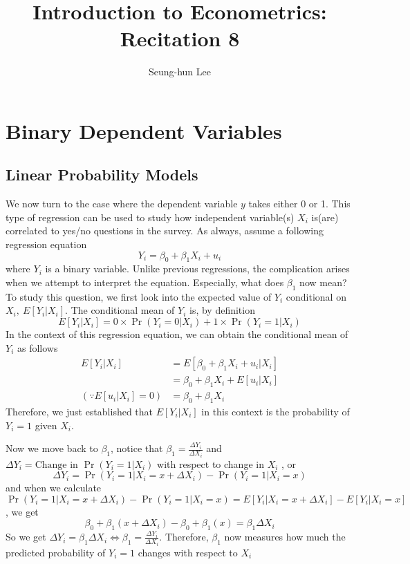 \documentclass[12pt]{article}
\title{Introduction to Econometrics: Recitation 8}
\theoremstyle{definition}
\theoremstyle{property}
\theoremstyle{assumption}
\theoremstyle{example}
\theoremstyle{comment}
\begin{document}
\linespread{1.25}
\author{Seung-hun Lee}
\date{}
\maketitle
\section{Binary Dependent Variables}
\subsection{Linear Probability Models}
We now turn to the case where the dependent variable $y$ takes either 0 or 1. This type of regression can be used to study how independent variable(s) $X_i$ is(are) correlated to yes/no questions in the survey. As always, assume a following regression equation
\[
Y_i = \beta_0 + \beta_1 X_i +u_i
\]
where $Y_i$ is a binary variable.  Unlike previous regressions, the complication arises when we attempt to interpret the equation. Especially, what does $\beta_1$ now mean? To study this question, we first look into the expected value of $Y_i$ conditional on $X_i,\ E[Y_i|X_i]$. The conditional mean of $Y_i$ is, by definition
\[
E[Y_i|X_i] = 0\times\Pr(Y_i=0|X_i)+1\times\Pr(Y_i=1|X_i)
\]
In the context of this regression equation, we can obtain the conditional mean of $Y_i$ as follows
\[
\begin{aligned}
E[Y_i|X_i]&=E[\beta_0+\beta_1X_i+u_i|X_i]\\
&=\beta_0 + \beta_1X_i + E[u_i|X_i]\\
(\because  E[u_i|X_i]=0)&=\beta_0 + \beta_1X_i 
\end{aligned}
\]
Therefore, we just established that $E[Y_i|X_i]$ in this context is the probability of $Y_i=1$ given $X_i$. \par\medskip
Now we move back to $\beta_1$, notice that $\beta_1 =\frac{\Delta Y_i}{\Delta X_i}$ and $\Delta Y_i = \text{Change in }\Pr(Y_i=1|X_i)$ with respect to change in $X_i$ , or
\[
\Delta Y_i = \Pr(Y_i=1|X_i=x+\Delta X_i)-\Pr(Y_i=1|X_i=x)
\]
and when we calculate $\Pr(Y_i=1|X_i=x+\Delta X_i)-\Pr(Y_i=1|X_i=x)=E[Y_i|X_i=x+\Delta X_i]-E[Y_i|X_i=x]$, we get
\[
\beta_0+\beta_1(x+\Delta X_i)-\beta_0+\beta_1(x) =\beta_1 \Delta X_i
\]
So we get $\Delta Y_i = \beta_1\Delta X_i\iff\beta_1 =\frac{\Delta Y_i}{\Delta X_i}$. Therefore, $\beta_1$ now measures how much the predicted probability of $Y_i=1$ changes with respect to $X_i$ \par\medskip
\end{document}
